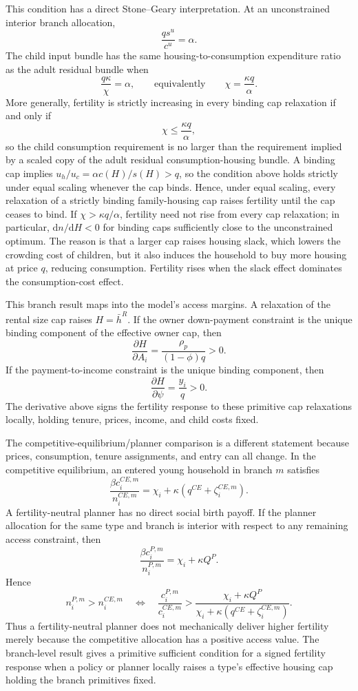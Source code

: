 \documentclass[11pt]{article}
\newcommand{\dd}{\mathrm d}
\newcommand{\1}{\mathbf 1}
\begin{document}
This condition has a direct Stone--Geary interpretation. At an unconstrained interior branch allocation,
\[
\frac{q s^u}{c^u}=\alpha.
\]
The child input bundle has the same housing-to-consumption expenditure ratio as the adult residual bundle when
\[
\frac{q\kappa}{\chi}=\alpha,
\qquad\text{equivalently}\qquad
\chi=\frac{\kappa q}{\alpha}.
\]
More generally, fertility is strictly increasing in every binding cap relaxation if and only if
\[
\chi\le \frac{\kappa q}{\alpha},
\]
so the child consumption requirement is no larger than the requirement implied by a scaled copy of the adult residual consumption-housing bundle. A binding cap implies $u_h/u_c=\alpha c(H)/s(H)>q$, so the condition above holds strictly under equal scaling whenever the cap binds. Hence, under equal scaling, every relaxation of a strictly binding family-housing cap raises fertility until the cap ceases to bind. If $\chi>\kappa q/\alpha$, fertility need not rise from every cap relaxation; in particular, $\dd n/\dd H<0$ for binding caps sufficiently close to the unconstrained optimum. The reason is that a larger cap raises housing slack, which lowers the crowding cost of children, but it also induces the household to buy more housing at price $q$, reducing consumption. Fertility rises when the slack effect dominates the consumption-cost effect.

This branch result maps into the model's access margins. A relaxation of the rental size cap raises $H=\bar h^R$. If the owner down-payment constraint is the unique binding component of the effective owner cap, then
\[
\frac{\partial H}{\partial A_i}
=
\frac{\rho_p}{(1-\phi)q}>0.
\]
If the payment-to-income constraint is the unique binding component, then
\[
\frac{\partial H}{\partial \psi}
=
\frac{y_i}{q}>0.
\]
The derivative above signs the fertility response to these primitive cap relaxations locally, holding tenure, prices, income, and child costs fixed.

The competitive-equilibrium/planner comparison is a different statement because prices, consumption, tenure assignments, and entry can all change. In the competitive equilibrium, an entered young household in branch $m$ satisfies
\[
\frac{\beta c_i^{CE,m}}{n_i^{CE,m}}
=
\chi_i+\kappa(q^{CE}+\zeta_i^{CE,m}).
\]
A fertility-neutral planner has no direct social birth payoff. If the planner allocation for the same type and branch is interior with respect to any remaining access constraint, then
\[
\frac{\beta c_i^{P,m}}{n_i^{P,m}}
=
\chi_i+\kappa Q^{P}.
\]
Hence
\[
n_i^{P,m}>n_i^{CE,m}
\quad\Longleftrightarrow\quad
\frac{c_i^{P,m}}{c_i^{CE,m}}
>
\frac{\chi_i+\kappa Q^{P}}
{\chi_i+\kappa(q^{CE}+\zeta_i^{CE,m})}.
\]
Thus a fertility-neutral planner does not mechanically deliver higher fertility merely because the competitive allocation has a positive access value. The branch-level result gives a primitive sufficient condition for a signed fertility response when a policy or planner locally raises a type's effective housing cap holding the branch primitives fixed.
\end{document}
